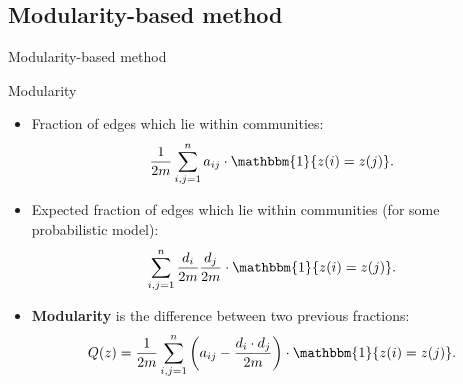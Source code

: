 \documentclass{beamer}
\theoremstyle{definition}
\theoremstyle{plain}
\theoremstyle{remark}
\begin{document}
		\subsection{Modularity-based method}
			\begin{frame}{Modularity-based method}
				\vspace{-5pt}
				\begin{block}{Modularity}
					\begin{itemize}
						\item Fraction of edges which lie within communities:
								\begin{equation}
									\begin{aligned}
										\frac{1}{2m} \sum\limits_{i,j=1}^{n} a_{ij} \cdot \mathbbm{1}\{ z(i) = z(j) \}.
										\nonumber
									\end{aligned}
								\end{equation}
						\item Expected fraction of edges which lie within communities (for some probabilistic model):
								\begin{equation}
									\begin{aligned}
										\sum\limits_{i,j=1}^{n}\frac{d_i}{2m}\frac{d_j}{2m} \cdot \mathbbm{1}\{ z(i) = z(j) \}.
										\nonumber
									\end{aligned}
								\end{equation}
						\item \textbf{Modularity} is the difference between two previous fractions:
								\begin{equation}
									\begin{aligned}
										Q(z) =
										\frac{1}{2m} \sum\limits_{i,j=1}^{n} \left(a_{ij} - \frac{d_i\cdot d_j}{2m}\right) \cdot \mathbbm{1}\{ z(i) = z(j) \}.
										\nonumber
									\end{aligned}
								\end{equation}
					\end{itemize}
				\end{block}
			\end{frame}
\end{document}
